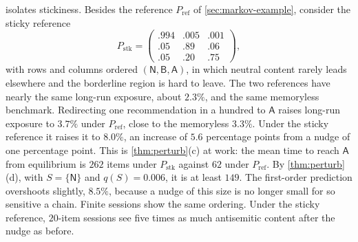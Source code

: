  isolates stickiness. Besides the reference $P_{\mathrm{ref}}$ of \cref{sec:markov-example}, consider the sticky reference
\[
  P_{\mathrm{stk}}=\begin{pmatrix}.994&.005&.001\\.05&.89&.06\\.05&.20&.75\end{pmatrix},
\]
with rows and columns ordered $(\mathsf N,\mathsf B,\mathsf A)$, in which neutral content rarely leads elsewhere and the borderline region is hard to leave. The two references have nearly the same long-run exposure, about $2.3\%$, and the same memoryless benchmark. Redirecting one recommendation in a hundred to $\mathsf A$ raises long-run exposure to $3.7\%$ under $P_{\mathrm{ref}}$, close to the memoryless $3.3\%$. Under the sticky reference it raises it to $8.0\%$, an increase of $5.6$ percentage points from a nudge of one percentage point. This is \cref{thm:perturb}(c) at work: the mean time to reach $\mathsf A$ from equilibrium is $262$ items under $P_{\mathrm{stk}}$ against $62$ under $P_{\mathrm{ref}}$. By \cref{thm:perturb}(d), with $S=\{\mathsf N\}$ and $q(S)=0.006$, it is at least $149$. The first-order prediction overshoots slightly, $8.5\%$, because a nudge of this size is no longer small for so sensitive a chain. Finite sessions show the same ordering. Under the sticky reference, $20$-item sessions see five times as much antisemitic content after the nudge as before.

